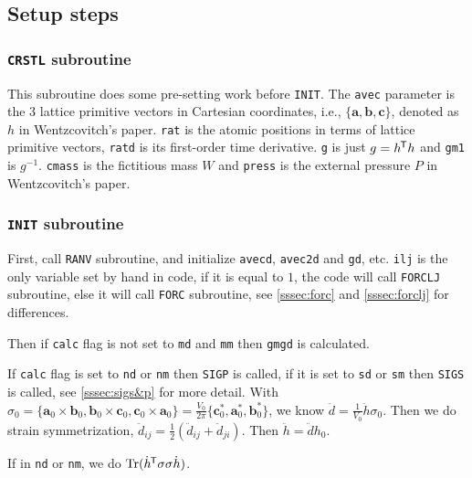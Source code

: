 \subsection{Setup steps}

\subsubsection{\texttt{CRSTL} subroutine}

This subroutine does some pre-setting work before \texttt{INIT}.
The \texttt{avec} parameter is the $3$ lattice primitive vectors in Cartesian
coordinates,
i.e., $\{ \bm{a}, \bm{b}, \bm{c} \}$,
denoted as $h$ in Wentzcovitch's paper.\cite{Wentzcovitch:1991ka}
\texttt{rat} is the atomic positions in terms of lattice primitive vectors,
\texttt{ratd} is its first-order time derivative.
\texttt{g} is just $g = h ^{\mkern-1.5mu\mathsf{T}} h$ and \texttt{gm1} is $g^{-1}$.
\texttt{cmass} is the fictitious mass $W$ and
\texttt{press} is the external pressure $P​$ in
Wentzcovitch's paper.\cite{Wentzcovitch:1991ka}


\subsubsection{\texttt{INIT} subroutine}

First, call \texttt{RANV} subroutine, and initialize \texttt{avecd},
\texttt{avec2d} and \texttt{gd}, etc.
\texttt{ilj} is the only variable set by hand in code, if it is equal to $1$,
the code will call \texttt{FORCLJ} subroutine, else it will call \texttt{FORC}
subroutine, see \ref{sssec:forc} and \ref{sssec:forclj} for differences.

Then if \texttt{calc} flag is not set to \texttt{md} and \texttt{mm}
then \texttt{gmgd} is calculated.

If \texttt{calc} flag is set to \texttt{nd} or \texttt{nm}
then \texttt{SIGP} is called, if it is set to \texttt{sd} or
\texttt{sm} then \texttt{SIGS} is called, see \ref{sssec:sigs&p}
for more detail.
With
$\sigma_0 = 
\{
\bm{a}_0 \times \bm{b}_0, \bm{b}_0 \times \bm{c}_0,
\bm{c}_0 \times \bm{a}_0 
\}
= \frac{ V_0 }{ 2\pi } \{
\bm{c}^\ast_0, \bm{a}^\ast_0, \bm{b}^\ast_0
\}$,
we know
$\ddot{d} = \frac{ 1 }{ V_0 }\ddot{h} \sigma_0$.
Then we do strain symmetrization, $\ddot{d}_{ij} = \frac{ 1 }{ 2 }
(\ddot{d}_{ij} + \ddot{d}_{ji})$.
Then $\ddot{h} = \ddot{d} h_0$.

If in \texttt{nd} or \texttt{nm}, we do 
$\operatorname{Tr} (\dot{h}^{\mkern-1.5mu\mathsf{T}} \sigma \sigma \dot{h})$.

